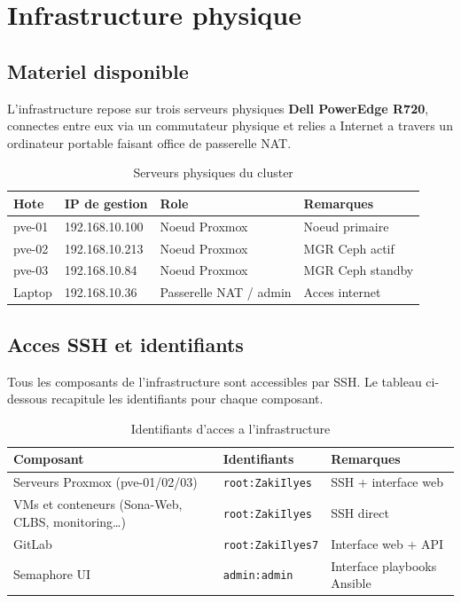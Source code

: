 \documentclass[a4paper,11pt]{article}
\begin{document}
\section{Infrastructure physique}

\subsection{Materiel disponible}

L'infrastructure repose sur trois serveurs physiques \textbf{Dell PowerEdge R720},
connectes entre eux via un commutateur physique et relies a Internet a travers
un ordinateur portable faisant office de passerelle NAT.

\begin{table}[H]
  \caption{Serveurs physiques du cluster}
  \centering
  \begin{tabular}{L{2.5cm}L{3.5cm}L{3.5cm}L{4cm}}
    \toprule
    \textbf{Hote} & \textbf{IP de gestion} & \textbf{Role} & \textbf{Remarques} \\
    \midrule
    pve-01 & 192.168.10.100 & Noeud Proxmox & Noeud primaire \\
    pve-02 & 192.168.10.213 & Noeud Proxmox & MGR Ceph actif \\
    pve-03 & 192.168.10.84  & Noeud Proxmox & MGR Ceph standby \\
    Laptop  & 192.168.10.36  & Passerelle NAT / admin & Acces internet \\
    \bottomrule
  \end{tabular}
\end{table}

\subsection{Acces SSH et identifiants}

Tous les composants de l'infrastructure sont accessibles par SSH. Le tableau ci-dessous
recapitule les identifiants pour chaque composant.

\begin{table}[H]
  \caption{Identifiants d'acces a l'infrastructure}
  \centering
  \begin{tabular}{L{4.5cm}L{3.2cm}L{4.5cm}}
    \toprule
    \textbf{Composant} & \textbf{Identifiants} & \textbf{Remarques} \\
    \midrule
    Serveurs Proxmox (pve-01/02/03) & \texttt{root:ZakiIlyes} & SSH + interface web \\
    VMs et conteneurs (Sona-Web, CLBS, monitoring\ldots) & \texttt{root:ZakiIlyes} & SSH direct \\
    GitLab & \texttt{root:ZakiIlyes7} & Interface web + API \\
    Semaphore UI & \texttt{admin:admin} & Interface playbooks Ansible \\
    \bottomrule
  \end{tabular}
\end{table}
\end{document}
